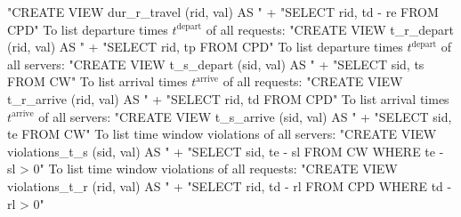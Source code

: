 "CREATE VIEW dur_r_travel (rid, val) AS "
  + "SELECT rid, td - re FROM CPD"
\nwendcode{}\nwdocspar
To list departure times $t^\textrm{depart}$ of all requests:
\nwenddocs{}\endmoddef{}
"CREATE VIEW t_r_depart (rid, val) AS "
  + "SELECT rid, tp FROM CPD"
\nwendcode{}\nwdocspar
To list departure times $t^\textrm{depart}$ of all servers:
\nwenddocs{}\endmoddef{}
"CREATE VIEW t_s_depart (sid, val) AS "
  + "SELECT sid, ts FROM CW"
\nwendcode{}\nwdocspar
To list arrival times $t^\textrm{arrive}$ of all requests:
\nwenddocs{}\endmoddef{}
"CREATE VIEW t_r_arrive (rid, val) AS "
  + "SELECT rid, td FROM CPD"
\nwendcode{}\nwdocspar
To list arrival times $t^\textrm{arrive}$ of all servers:
\nwenddocs{}\endmoddef{}
"CREATE VIEW t_s_arrive (sid, val) AS "
  + "SELECT sid, te FROM CW"
\nwendcode{}\nwdocspar
To list time window violations of all servers:
\nwenddocs{}\endmoddef{}
"CREATE VIEW violations_t_s (sid, val) AS "
  + "SELECT sid, te - sl FROM CW WHERE te - sl > 0"
\nwendcode{}\nwdocspar
To list time window violations of all requests:
\nwenddocs{}\endmoddef{}
"CREATE VIEW violations_t_r (rid, val) AS "
  + "SELECT rid, td - rl FROM CPD WHERE td - rl > 0"
\nwendcode{}

\nwdocspar
\nwenddocs{}
